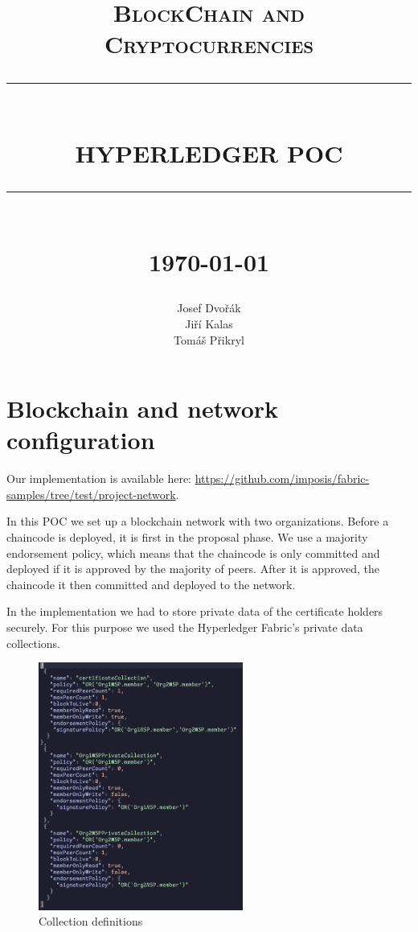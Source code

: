 \documentclass[12pt]{article}
\newcommand{\HRule}[1]{\rule{\linewidth}{#1}}
\begin{document}
\begin{titlepage}
  \title{ \normalsize \textsc{BlockChain and Cryptocurrencies}
      \\ [2.0cm]
      \HRule{0.5pt} \\
      \LARGE \textbf{\uppercase{HyperLedger POC}}
      \HRule{2pt} \\ [0.5cm]
      \normalsize \today \vspace*{5\baselineskip}}

  \date{}

  \author{
      Josef Dvořák \\
      Jiří Kalas \\
      Tomáš Přikryl }

  \thispagestyle{empty}
  \maketitle
  \thispagestyle{fancy}
\end{titlepage}
\newpage

\tableofcontents
\newpage

\section{Blockchain and network configuration}

Our implementation is available here: \url{https://github.com/imposis/fabric-samples/tree/test/project-network}.

In this POC we set up a blockchain network with two organizations.
Before a chaincode is deployed, it is first in the proposal phase.
We use a majority endorsement policy, which means that the chaincode is only committed and deployed if it is approved by the majority of peers.
After it is approved, the chaincode it then committed and deployed to the network.

In the implementation we had to store private data of the certificate holders securely. For this purpose we used the Hyperledger Fabric's private data collections.
\begin{figure}[H]
    \centering
    \includegraphics[width=0.6\textwidth]{imgs/collection_json.PNG}
    \caption{Collection definitions}
    \label{fig:collection}
\end{figure}
\end{document}
